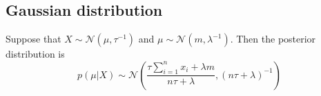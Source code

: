 \subsection{Gaussian distribution}

\newcommand{\gauss}{\mathcal{N}}

Suppose that $X \sim \gauss(\mu, \tau^{-1})$ and $\mu \sim \gauss(m,\lambda^{-1})$.
Then the posterior distribution is
\begin{equation}
p(\mu|X) \sim \gauss\left(
\frac{\tau \sum_{i=1}^n x_i + \lambda m}{n\tau + \lambda},
(n\tau + \lambda)^{-1}
\right)
\end{equation}

